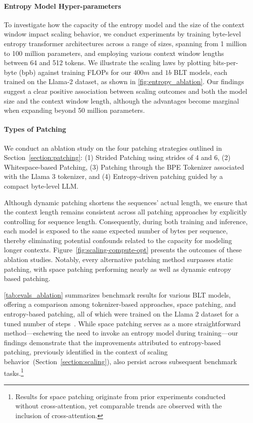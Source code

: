 \paragraph{Entropy Model Hyper-parameters} To investigate how the capacity of the entropy model and the size of the context window impact scaling behavior, we conduct experiments by training byte-level entropy transformer architectures across a range of sizes, spanning from 1 million to 100 million parameters, and employing various context window lengths between 64 and 512 tokens. We illustrate the scaling laws by plotting bits-per-byte (bpb) against training FLOPs for our $400m$ and $1b$ {\textsc BLT} models, each trained on the Llama-2 dataset, as shown in \autoref{fig:entropy_ablation}. Our findings suggest a clear positive association between scaling outcomes and both the model size and the context window length, although the advantages become marginal when expanding beyond 50 million parameters.

\paragraph{Types of Patching}

We conduct an ablation study on the four patching strategies outlined in Section~\ref{section:patching}: (1) Strided Patching using strides of 4 and 6, (2) Whitespace-based Patching, (3) Patching through the BPE Tokenizer associated with the Llama 3 tokenizer, and (4) Entropy-driven patching guided by a compact byte-level LLM.

Although dynamic patching shortens the sequences' actual length, we ensure that the context length remains consistent across all patching approaches by explicitly controlling for sequence length. Consequently, during both training and inference, each model is exposed to the same expected number of bytes per sequence, thereby eliminating potential confounds related to the capacity for modeling longer contexts. Figure~\ref{fig:scaling-compute-opt} presents the outcomes of these ablation studies. Notably, every alternative patching method surpasses static patching, with space patching performing nearly as well as dynamic entropy based patching.

\autoref{tab:evals_ablation} summarizes benchmark results for various {\textsc BLT} models, offering a comparison among tokenizer-based approaches, space patching, and entropy-based patching, all of which were trained on the Llama 2 dataset for a tuned number of steps~\citep{dubey2024llama}. While space patching serves as a more straightforward method—eschewing the need to invoke an entropy model during training—our findings demonstrate that the improvements attributed to entropy-based patching, previously identified in the context of scaling behavior~(Section~\ref{section:scaling}), also persist across subsequent benchmark tasks.\footnote{Results for space patching originate from prior experiments conducted without cross-attention, yet comparable trends are observed with the inclusion of cross-attention.}

